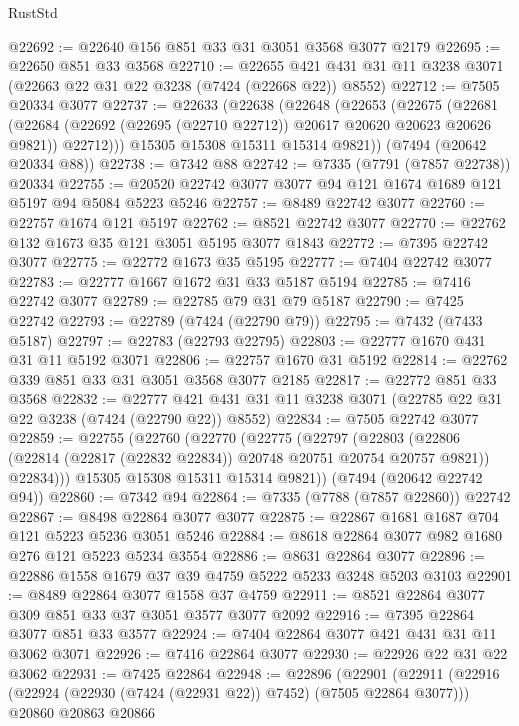 \begin{lexlean}{RustStd}
\begin{coremodule}
@22692 := @22640 @156 @851 @33 @31 @3051 @3568 @3077 @2179
@22695 := @22650 @851 @33 @3568
@22710 := @22655 @421 @431 @31 @11 @3238 @3071 (@22663 @22 @31 @22 @3238 (@7424 (@22668 @22)) @8552)
@22712 := @7505 @20334 @3077
@22737 := @22633
    (@22638
      (@22648
        (@22653
          (@22675
            (@22681
              (@22684 (@22692 (@22695 (@22710 @22712)) @20617 @20620 @20623 @20626 @9821))
              @22712)))
        @15305
        @15308
        @15311
        @15314
        @9821))
    (@7494 (@20642 @20334 @88))
@22738 := @7342 @88
@22742 := @7335 (@7791 (@7857 @22738)) @20334
@22755 := @20520 @22742 @3077 @3077 @94 @121 @1674 @1689 @121 @5197 @94 @5084 @5223 @5246
@22757 := @8489 @22742 @3077
@22760 := @22757 @1674 @121 @5197
@22762 := @8521 @22742 @3077
@22770 := @22762 @132 @1673 @35 @121 @3051 @5195 @3077 @1843
@22772 := @7395 @22742 @3077
@22775 := @22772 @1673 @35 @5195
@22777 := @7404 @22742 @3077
@22783 := @22777 @1667 @1672 @31 @33 @5187 @5194
@22785 := @7416 @22742 @3077
@22789 := @22785 @79 @31 @79 @5187
@22790 := @7425 @22742
@22793 := @22789 (@7424 (@22790 @79))
@22795 := @7432 (@7433 @5187)
@22797 := @22783 (@22793 @22795)
@22803 := @22777 @1670 @431 @31 @11 @5192 @3071
@22806 := @22757 @1670 @31 @5192
@22814 := @22762 @339 @851 @33 @31 @3051 @3568 @3077 @2185
@22817 := @22772 @851 @33 @3568
@22832 := @22777 @421 @431 @31 @11 @3238 @3071 (@22785 @22 @31 @22 @3238 (@7424 (@22790 @22)) @8552)
@22834 := @7505 @22742 @3077
@22859 := @22755
    (@22760
      (@22770
        (@22775
          (@22797
            (@22803
              (@22806 (@22814 (@22817 (@22832 @22834)) @20748 @20751 @20754 @20757 @9821))
              @22834)))
        @15305
        @15308
        @15311
        @15314
        @9821))
    (@7494 (@20642 @22742 @94))
@22860 := @7342 @94
@22864 := @7335 (@7788 (@7857 @22860)) @22742
@22867 := @8498 @22864 @3077 @3077
@22875 := @22867 @1681 @1687 @704 @121 @5223 @5236 @3051 @5246
@22884 := @8618 @22864 @3077 @982 @1680 @276 @121 @5223 @5234 @3554
@22886 := @8631 @22864 @3077
@22896 := @22886 @1558 @1679 @37 @39 @4759 @5222 @5233 @3248 @5203 @3103
@22901 := @8489 @22864 @3077 @1558 @37 @4759
@22911 := @8521 @22864 @3077 @309 @851 @33 @37 @3051 @3577 @3077 @2092
@22916 := @7395 @22864 @3077 @851 @33 @3577
@22924 := @7404 @22864 @3077 @421 @431 @31 @11 @3062 @3071
@22926 := @7416 @22864 @3077
@22930 := @22926 @22 @31 @22 @3062
@22931 := @7425 @22864
@22948 := @22896
    (@22901
      (@22911
        (@22916 (@22924 (@22930 (@7424 (@22931 @22)) @7452) (@7505 @22864 @3077)))
        @20860
        @20863
        @20866

\end{coremodule}
\end{lexlean}

